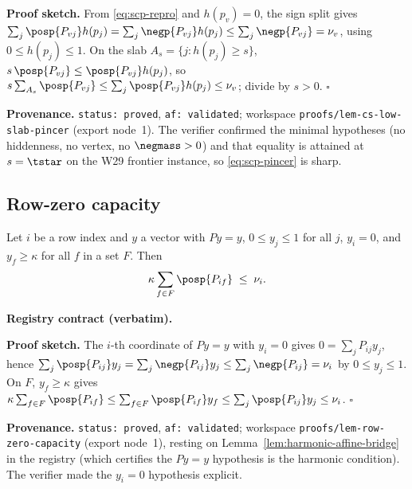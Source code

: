 \noindent\textbf{Proof sketch.} From \eqref{eq:scp-repro} and $h(p_v)=0$, the sign split gives
$\sum_j\posp{P_{vj}}h(p_j)=\sum_j\negp{P_{vj}}h(p_j)\le\sum_j\negp{P_{vj}}=\nu_v$, using
$0\le h(p_j)\le1$. On the slab $A_s=\{j:h(p_j)\ge s\}$, $s\,\posp{P_{vj}}\le\posp{P_{vj}}h(p_j)$, so
$s\sum_{A_s}\posp{P_{vj}}\le\sum_j\posp{P_{vj}}h(p_j)\le\nu_v$; divide by $s>0$. \hfill$\square$

\noindent\textbf{Provenance.} \texttt{status: proved}, \texttt{af: validated}; workspace
\texttt{proofs/lem-cs-low-slab-pincer} (export node~1). The verifier confirmed the minimal hypotheses
(no hiddenness, no vertex, no $\negmass>0$) and that equality is attained at $s=\tstar$ on the W29
frontier instance, so \eqref{eq:scp-pincer} is sharp.

\subsection{Row-zero capacity}

\begin{lemma}\label{lem:row-zero-capacity}
Let $i$ be a row index and $y$ a vector with $Py=y$, $0\le y_j\le1$ for all $j$, $y_i=0$, and
$y_f\ge\kappa$ for all $f$ in a set $F$. Then
\begin{equation}\label{eq:scp-capacity}
  \kappa\sum_{f\in F}\posp{P_{if}}\;\le\;\nu_i .
\end{equation}
\end{lemma}

\noindent\textbf{Registry contract (verbatim).}

\noindent\textbf{Proof sketch.} The $i$-th coordinate of $Py=y$ with $y_i=0$ gives
$0=\sum_j P_{ij}y_j$, hence $\sum_j\posp{P_{ij}}y_j=\sum_j\negp{P_{ij}}y_j\le\sum_j\negp{P_{ij}}=\nu_i$
by $0\le y_j\le1$. On $F$, $y_f\ge\kappa$ gives
$\kappa\sum_{f\in F}\posp{P_{if}}\le\sum_{f\in F}\posp{P_{if}}y_f\le\sum_j\posp{P_{ij}}y_j\le\nu_i$.
\hfill$\square$

\noindent\textbf{Provenance.} \texttt{status: proved}, \texttt{af: validated}; workspace
\texttt{proofs/lem-row-zero-capacity} (export node~1), resting on
Lemma~\ref{lem:harmonic-affine-bridge} in the registry (which certifies the $Py=y$ hypothesis is the
harmonic condition). The verifier made the $y_i=0$ hypothesis explicit.

